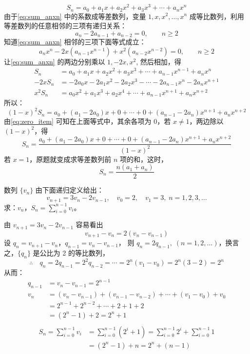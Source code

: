 \begin{solution}
  \begin{equation}
    \label{eq:sum_anxn}
    S_n=a_0+a_1x+a_2x^2+a_3x^3+\cdots+a_nx^n
  \end{equation}
由于\cref{eq:sum_anxn} 中的系数成等差数列，变量 $1,x,x^2,\ldots,x^n$ 成等比数列，利用等差数列的任意相邻的三项有递归关系：
\begin{equation}
    a_n-2a_{n-1}+a_{n-2}=0,\qquad n\geqslant 2
\end{equation}
知道\cref{eq:sum_anxn} 相邻的三项下面等式成立：
\begin{equation}
  \label{eq:zero_item}
  a_nx^n-2x(a_{n-1}x^{n-1})+x^2(a_{n-2}x^{n-2})=0,\qquad n\geqslant 2
\end{equation}
让\cref{eq:sum_anxn} 的两边分别乘以 $1,-2x,x^2$, 然后相加，得
\[\begin{split}
    S_n&=a_0+a_1x+a_2x^2+a_3x^3+\cdots+a_{n-1}x^{n-1}+a_nx^n\\
    -2xS_n&=-2a_0x-2a_1x^2-2a_2x^3-\cdots-2a_{n-1}x^n-2a_nx^{n+1}\\
    x^2S_n&=a_0x^2+a_1x^3+a_2x^4+\cdots+a_{n-1}x^{n+1}+a_nx^{n+2}
\end{split}\]
所以：
\[(1-x)^2 S_n=a_0+(a_1-2a_0)x+0+\cdots+0+(a_{n-1}-2a_n)x^{n+1}+a_nx^{n+2}\]
由\cref{eq:zero_item} 可知在上面等式中，其余各项为 0，若 $x\neq 1$，两边除以 $(1-x)^2$，得
\[S_n=\frac{a_0+(a_1-2a_0)x+0+\cdots+0+(a_{n-1}-2a_n)x^{n+1}+a_nx^{n+2}}{(1-x)^2}\]
若 $x=1$，原题就变成求等差数列前 $n$ 项的和，这时，
\[S_n=\frac{n(a_1+a_n)}{2}\]
\end{solution}

\begin{example}
    数列 $\{v_n\}$ 由下面递归定义给出：
 \[ v_{n+1}=3v_n-2v_{n-1},\quad v_0=2,\quad v_1=3,\; n=1,2,3,\ldots\]
 求：$v_n$，$S_n=\sum\limits^{n-1}_{i=0}v_i$。
\end{example}

\begin{solution}
    由 $v_{n+1}=3v_n-2v_{n-1}$ 容易看出
  \[  v_{n+1}-v_{n}=2(v_n-v_{n-1})\]
    设 $q_n=v_{n+1}-v_n$，$q_{n-1}=v_n-v_{n-1}$， 则 $q_n=2q_{n-1},\; (n=1,2,\ldots)$，换言之，$\{q_n\}$ 是公比为 2 的等比数列，
\[\therefore\quad q_n=2q_{n-1}=2^2q_{n-2}=\cdots=2^n(v_1-v_0)=2^n(3-2)=2^n\]
从而：
\[\begin{split}
    q_{n-1}&=v_n-v_{n-1}=2^{n-1}\\
v_n&=(v_n-v_{n-1})+(v_{n-1}-v_{n-2})+\cdots+(v_1-v_0)+v_0\\
&=2^{n-1}+2^{n-2}+\cdots +2+1+2\\
&=(2^n-1)+2=2^n+1\\
\end{split}\]
\[\begin{split}
    S_n=\sum^{n-1}_{i=0}v_i&=\sum^{n-1}_{i=0}(2^i+1)=\sum^{n-1}_{i=0}2^i+\sum^{n-1}_{i=0}1\\
    &=(2^n-1)+n=2^n+(n-1)
\end{split}\]
\end{solution}

